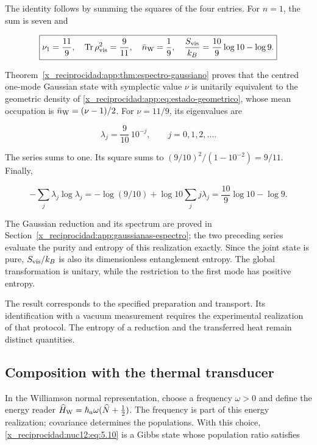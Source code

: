 The identity follows by summing the squares of the four entries. For \(n=1\), the sum is seven and



\begin{equation}
\boxed{\nu_1=\frac{11}{9},\quad
\operatorname{Tr}\rho_{\rm vis}^2=\frac9{11},\quad
\bar n_{\rm W}=\frac19,\quad
\frac{S_{\rm vis}}{k_B}=\frac{10}{9}\log10-\log9.}
\label{x_reciprocidad:nuc12:eq:5.9}
\end{equation}



Theorem~\ref{x_reciprocidad:app:thm:espectro-gaussiano} proves that the centred one-mode Gaussian state with symplectic value \(\nu\) is unitarily equivalent to the geometric density of \eqref{x_reciprocidad:app:eq:estado-geometrico}, whose mean occupation is \(\bar n_{\rm W}=(\nu-1)/2\). For \(\nu=11/9\), its eigenvalues are



\begin{equation}
\lambda_j=\frac9{10}\,10^{-j},\qquad j=0,1,2,\ldots.
\label{x_reciprocidad:nuc12:eq:5.10}
\end{equation}



The series sums to one. Its square sums to \((9/10)^2/(1-10^{-2})=9/11\). Finally,


\[
-\sum_j\lambda_j\log\lambda_j
=-\log(9/10)+\log10\sum_jj\lambda_j
=\frac{10}{9}\log10-\log9.
\]



The Gaussian reduction and its spectrum are proved in Section~\ref{x_reciprocidad:app:gaussianas-espectro}; the two preceding series evaluate the purity and entropy of this realization exactly. Since the joint state is pure, \(S_{\rm vis}/k_B\) is also its dimensionless entanglement entropy. The global transformation is unitary, while the restriction to the first mode has positive entropy.

The result corresponds to the specified preparation and transport. Its identification with a vacuum measurement requires the experimental realization of that protocol. The entropy of a reduction and the transferred heat remain distinct quantities.

\subsection{Composition with the thermal transducer}

In the Williamson normal representation, choose a frequency \(\omega>0\) and define the energy reader \(\widehat H_{\rm W}=\hbar_a\omega(\widehat N+\tfrac12)\). The frequency is part of this energy realization; covariance determines the populations. With this choice, \eqref{x_reciprocidad:nuc12:eq:5.10} is a Gibbs state whose population ratio satisfies



